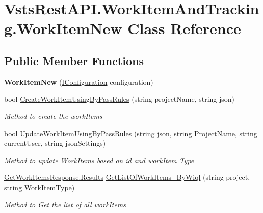 \hypertarget{class_vsts_rest_a_p_i_1_1_work_item_and_tracking_1_1_work_item_new}{}\section{Vsts\+Rest\+A\+P\+I.\+Work\+Item\+And\+Tracking.\+Work\+Item\+New Class Reference}
\label{class_vsts_rest_a_p_i_1_1_work_item_and_tracking_1_1_work_item_new}
\subsection*{Public Member Functions}
\begin{DoxyCompactItemize}
\item 
\mbox{\label{class_vsts_rest_a_p_i_1_1_work_item_and_tracking_1_1_work_item_new_a07548faca1ec5d274d10f242f8b71513}} 
{\bfseries Work\+Item\+New} (\mbox{\hyperlink{interface_vsts_rest_a_p_i_1_1_i_configuration}{I\+Configuration}} configuration)
\item 
bool \mbox{\hyperlink{class_vsts_rest_a_p_i_1_1_work_item_and_tracking_1_1_work_item_new_a1643c3e8181a916c62d329085f07995b}{Create\+Work\+Item\+Using\+By\+Pass\+Rules}} (string project\+Name, string json)
\begin{DoxyCompactList}\small\item\em Method to create the work\+Items \end{DoxyCompactList}\item 
bool \mbox{\hyperlink{class_vsts_rest_a_p_i_1_1_work_item_and_tracking_1_1_work_item_new_ae0eb3a3a473c7a1b117199a77466ab72}{Update\+Work\+Item\+Using\+By\+Pass\+Rules}} (string json, string Project\+Name, string current\+User, string json\+Settings)
\begin{DoxyCompactList}\small\item\em Method to update \mbox{\hyperlink{class_vsts_rest_a_p_i_1_1_work_item_and_tracking_1_1_work_items}{Work\+Items}} based on id and work\+Item Type \end{DoxyCompactList}\item 
\mbox{\hyperlink{class_vsts_rest_a_p_i_1_1_viewmodel_1_1_work_item_1_1_get_work_items_response_1_1_results}{Get\+Work\+Items\+Response.\+Results}} \mbox{\hyperlink{class_vsts_rest_a_p_i_1_1_work_item_and_tracking_1_1_work_item_new_ab6104d3b32004b835a05393a7220a7fc}{Get\+List\+Of\+Work\+Items\+\_\+\+By\+Wiql}} (string project, string Work\+Item\+Type)
\begin{DoxyCompactList}\small\item\em Method to Get the list of all work\+Items \end{DoxyCompactList}\end{DoxyCompactItemize}
